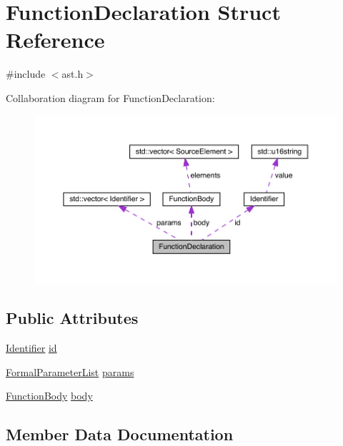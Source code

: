 \hypertarget{struct_function_declaration}{}\section{Function\+Declaration Struct Reference}
\label{struct_function_declaration}


{\ttfamily \#include $<$ast.\+h$>$}



Collaboration diagram for Function\+Declaration\+:\nopagebreak
\begin{figure}[H]
\begin{center}
\leavevmode
\includegraphics[width=350pt]{struct_function_declaration__coll__graph}
\end{center}
\end{figure}
\subsection*{Public Attributes}
\begin{DoxyCompactItemize}
\item 
\hyperlink{struct_identifier}{Identifier} \hyperlink{struct_function_declaration_a870d4699e91dd3157a5de4162ceb485b}{id}
\item 
\hyperlink{ast_8h_ad423d9c7b02512f74f787f74587e9e76}{Formal\+Parameter\+List} \hyperlink{struct_function_declaration_a4de4e4084ad0e0cd285e0279759aca10}{params}
\item 
\hyperlink{struct_function_body}{Function\+Body} \hyperlink{struct_function_declaration_a3bbafdaf6d179f005fc87656dc3df583}{body}
\end{DoxyCompactItemize}


\subsection{Member Data Documentation}
\mbox{\label{struct_function_declaration_a3bbafdaf6d179f005fc87656dc3df583}} 

